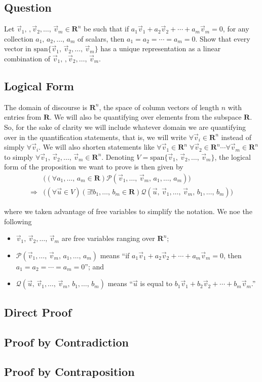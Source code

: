 \documentclass[a4paper,11pt]{article}
\newcommand{\R}{\mathbf{R}}
\newcommand{\PP}{\mathscr{P}}
\newcommand{\QQ}{\mathscr{Q}}
\begin{document}
\subsection*{Question}

Let $\vec v_1,\,,\vec v_2,\dots,\,\vec v_m \in \R^n$ be such that if $a_1\vec
v_1 + a_2\vec v_2 + \cdots + a_m\vec v_m=0$, for any collection
$a_1,\,a_2,\dots,\,a_m$ of scalars, then $a_1=a_2=\cdots=a_m=0$. Show that every
vector in $\text{span}\{\vec v_1,\,\vec v_2,\dots,\,\vec v_m\}$ has a unique
representation as a linear combination of $\vec v_1,\,,\vec v_2,\dots,\,\vec v_m$.

\subsection*{Logical Form}

The domain of discourse is $\R^n$, the space of column vectors of length $n$
with entries from $\R$. We will also be quantifying over elements from the
subspace $\R$. So, for the sake of clarity we will include whatever domain we
are quantifying over in the quantification statements, that is, we will write
$\forall \vec v_i \in \R^n$ instead of simply $\forall \vec v_i$. We will also
shorten statements like $\forall\vec v_1 \in \R^n\;\forall\vec v_2 \in \R^n
\cdots \forall\vec v_m \in \R^n$ to simply $\forall\vec v_1,\,\vec
v_2,\dots,\,\vec v_m \in \R^n$. Denoting $V=\text{span}\{\vec v_1,\,\vec
v_2,\dots,\,\vec v_m\}$, the logical form of the proposition we want to prove is
then given by
\begin{align*}
  &\Big(
  (\forall a_1,\dots,\,a_m \in \R)\PP(\vec v_1,\dots,\,\vec v_m,\,a_1,\dots,\,a_m)
  \Big) \\
  \Rightarrow&
  \Big(
  (\forall\vec u \in V)(\exists!b_1,\dots,\,b_m \in \R)\QQ(\vec
  u,\,\vec v_1,\dots,\,\vec v_m,\,b_1,\dots,\,b_m)
  \Big)
\end{align*}

\noindent where we taken advantage of free variables to simplify the notation.
We noe the following
\begin{itemize}
\item $\vec v_1,\,\vec v_2,\dots,\,\vec v_m$ are free variables ranging over
  $\R^n$;
\item $\PP(\vec v_1,\dots,\,\vec v_m,\,a_1,\dots,\,a_m)$ means ``if $a_1\vec v_1
  + a_2\vec v_2 + \cdots + a_m\vec v_m =0$, then $a_1=a_2=\cdots=a_m=0$''; and
\item $\QQ(\vec u,\,\vec v_1,\dots,\,\vec v_m,\,b_1,\dots,\,b_m)$ means ``$\vec
  u$ is equal to $b_1\vec v_1 + b_2\vec v_2 + \cdots + b_m\vec v_m$.''
\end{itemize}

\subsection*{Direct Proof}

\subsection*{Proof by Contradiction}

\subsection*{Proof by Contraposition}
\end{document}
